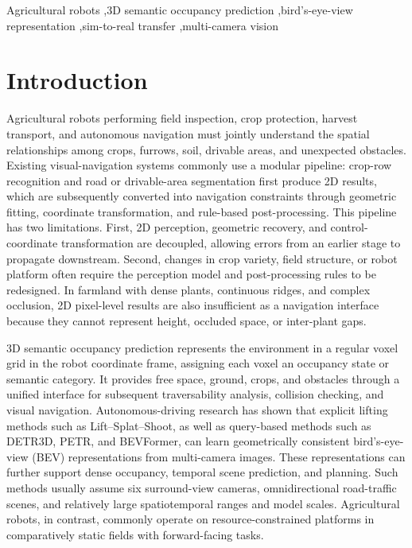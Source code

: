 \documentclass[a4paper,fleqn]{cas-sc}
\begin{document}
\begin{keywords}
Agricultural robots \sep 3D semantic occupancy prediction \sep bird's-eye-view representation \sep sim-to-real transfer \sep multi-camera vision
\end{keywords}
\maketitle

\section{Introduction}\label{sec:intro}
Agricultural robots performing field inspection, crop protection, harvest transport, and autonomous navigation must jointly understand the spatial relationships among crops, furrows, soil, drivable areas, and unexpected obstacles. Existing visual-navigation systems commonly use a modular pipeline: crop-row recognition and road or drivable-area segmentation first produce 2D results, which are subsequently converted into navigation constraints through geometric fitting, coordinate transformation, and rule-based post-processing\citep{nkwochaComprehensiveReviewSensing2025,baiVisionbasedNavigationGuidance2023}. This pipeline has two limitations. First, 2D perception, geometric recovery, and control-coordinate transformation are decoupled, allowing errors from an earlier stage to propagate downstream. Second, changes in crop variety, field structure, or robot platform often require the perception model and post-processing rules to be redesigned. In farmland with dense plants, continuous ridges, and complex occlusion, 2D pixel-level results are also insufficient as a navigation interface because they cannot represent height, occluded space, or inter-plant gaps.

3D semantic occupancy prediction represents the environment in a regular voxel grid in the robot coordinate frame, assigning each voxel an occupancy state or semantic category. It provides free space, ground, crops, and obstacles through a unified interface for subsequent traversability analysis, collision checking, and visual navigation. Autonomous-driving research has shown that explicit lifting methods such as Lift--Splat--Shoot\citep{philion2020lift,huang2021bevdet,li2022bevdepth}, as well as query-based methods such as DETR3D, PETR, and BEVFormer\citep{wang2022detr3d,li2022petr,li2022bevformer}, can learn geometrically consistent bird's-eye-view (BEV) representations from multi-camera images. These representations can further support dense occupancy\citep{wei2023surroundocc,wang2023openoccupancy}, temporal scene prediction, and planning\citep{zheng2024occworld,mei2025irwm}. Such methods usually assume six surround-view cameras, omnidirectional road-traffic scenes, and relatively large spatiotemporal ranges and model scales. Agricultural robots, in contrast, commonly operate on resource-constrained platforms in comparatively static fields with forward-facing tasks.
\end{document}
